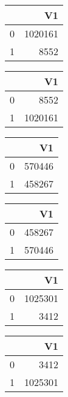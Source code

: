 \bigskip\bigskip
\centering
\begin{tabular}{rr}
  \hline
 & V1 \\ 
  \hline
0 & 1020161 \\ 
  1 & 8552 \\ 
   \hline
\end{tabular}

\bigskip\bigskip
\centering
\begin{tabular}{rr}
  \hline
 & V1 \\ 
  \hline
0 & 8552 \\ 
  1 & 1020161 \\ 
   \hline
\end{tabular}

\bigskip\bigskip
\centering
\begin{tabular}{rr}
  \hline
 & V1 \\ 
  \hline
0 & 570446 \\ 
  1 & 458267 \\ 
   \hline
\end{tabular}

\bigskip\bigskip
\centering
\begin{tabular}{rr}
  \hline
 & V1 \\ 
  \hline
0 & 458267 \\ 
  1 & 570446 \\ 
   \hline
\end{tabular}

\bigskip\bigskip
\centering
\begin{tabular}{rr}
  \hline
 & V1 \\ 
  \hline
0 & 1025301 \\ 
  1 & 3412 \\ 
   \hline
\end{tabular}

\bigskip\bigskip
\centering
\begin{tabular}{rr}
  \hline
 & V1 \\ 
  \hline
0 & 3412 \\ 
  1 & 1025301 \\ 
   \hline
\end{tabular}

